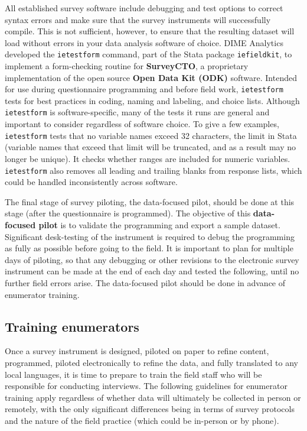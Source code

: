 All established survey software include debugging and test options
to correct syntax errors and make sure that
the survey instruments will successfully compile.
This is not sufficient, however, to ensure that the resulting dataset
will load without errors in your data analysis software of choice.
DIME Analytics developed the \texttt{ietestform} command,
part of the Stata package \texttt{iefieldkit},
to implement a form-checking routine for \textbf{SurveyCTO},
a proprietary implementation of the open source \textbf{Open Data Kit (ODK)} software.
Intended for use during questionnaire programming and before field work,
\texttt{ietestform} tests for best practices
in coding, naming and labeling, and choice lists.
Although \texttt{ietestform} is software-specific,
many of the tests it runs are general and important to consider regardless of software choice.
To give a few examples, \texttt{ietestform} tests that no variable names exceed
32 characters, the limit in Stata (variable names that exceed that limit will
be truncated, and as a result may no longer be unique).
It checks whether ranges are included for numeric variables.
\texttt{ietestform} also removes all leading and trailing blanks from response lists,
which could be handled inconsistently across software.

The final stage of survey piloting, the data-focused pilot, should be done at this stage (after the questionnaire is programmed).
The objective of this \textbf{data-focused pilot}
is to validate the programming and export a sample dataset.
Significant desk-testing of the instrument is required to debug the programming
as fully as possible before going to the field.
It is important to plan for multiple days of piloting,
so that any debugging or other revisions to the electronic survey instrument
can be made at the end of each day and tested the following, until no further field errors arise.
The data-focused pilot should be done in advance of enumerator training.

\subsection{Training enumerators}
Once a survey instrument is designed, piloted on paper to refine content,
programmed, piloted electronically to refine the data,
and fully translated to any local languages,
it is time to prepare to train the field staff who will be
responsible for conducting interviews.
The following guidelines for enumerator training apply regardless of
whether data will ultimately be collected in person or remotely,
with the only significant differences being in terms of survey protocols and
the nature of the field practice (which could be in-person or by phone).

